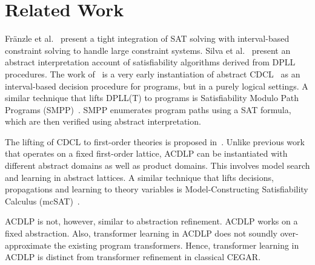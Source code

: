 \section{Related Work}

Fr{\"a}nzle et al.~\cite{franzle} present a tight integration of SAT solving
with interval-based constraint solving to handle large constraint systems.
%
Silva et al.~\cite{sas12} present an abstract interpretation account of 
satisfiability algorithms derived from DPLL procedures.  
%
The work of~\cite{tacas12} is a very early instantiation of abstract 
CDCL~\cite{sas12} as an interval-based decision procedure for programs, 
but in a purely logical settings.  
%
A similar technique that lifts DPLL(T) to programs is Satisfiability Modulo 
Path Programs (SMPP)~\cite{SMPP}. SMPP enumerates program paths using a SAT 
formula, which are then verified using abstract interpretation.  
%

The lifting of CDCL to first-order theories is proposed
in~\cite{dpll,ndsmt,vmcai13}.  Unlike previous work that operates on a fixed
first-order lattice, ACDLP can be instantiated with different abstract
domains as well as product domains.  This involves model search and learning
in abstract lattices.  A similar technique that lifts decisions,
propagations and learning to theory variables is Model-Constructing
Satisfiability Calculus (mcSAT)~\cite{vmcai13}.

%
  
  ACDLP is not, however, similar to abstraction refinement. ACDLP works on a fixed
  abstraction. Also, transformer learning in ACDLP does not soundly over-approximate
  the existing program transformers. 
  Hence, transformer learning in ACDLP is distinct from transformer refinement in classical CEGAR. 

%
%
%
%

